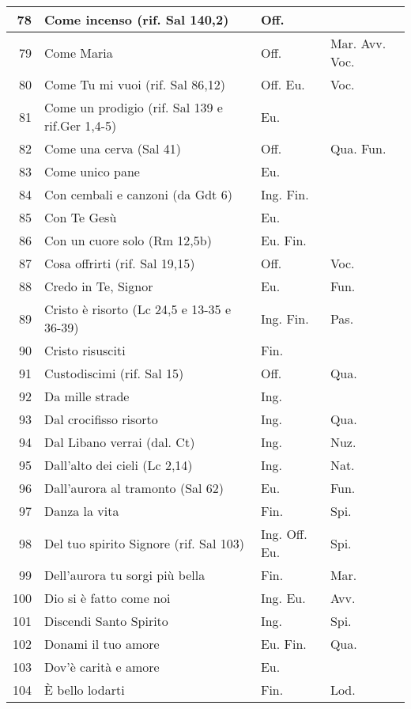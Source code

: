 {\begin{center}
\begin{longtable}{ | r | m{4.7cm} | m{1.8cm} | m{2cm}  |}
    78 & Come incenso (rif. Sal 140,2) & Off. & \\ \hline
    79 & Come Maria & Off. & Mar. Avv. Voc.\\ \hline
    80 & Come Tu mi vuoi (rif. Sal 86,12) & Off. Eu. & Voc.\\ \hline
    81 & Come un prodigio (rif. Sal 139 e rif.Ger 1,4-5) & Eu. & \\ \hline
    82 & Come una cerva (Sal 41) & Off. & Qua. Fun.\\ \hline
    83 & Come unico pane & Eu. & \\ \hline
    84 & Con cembali e canzoni (da Gdt 6) & Ing. Fin. & \\ \hline
    85 & Con Te Gesù & Eu. & \\ \hline
    86 & Con un cuore solo (Rm 12,5b) & Eu. Fin. & \\ \hline
    87 & Cosa offrirti (rif. Sal 19,15) & Off. & Voc.\\ \hline
    88 & Credo in Te, Signor & Eu. & Fun.\\ \hline
    89 & Cristo è risorto (Lc 24,5 e 13-35 e 36-39) & Ing. Fin. & Pas.\\ \hline
    90 & Cristo risusciti & Fin. & \\ \hline
    91 & Custodiscimi (rif. Sal 15) & Off. & Qua.\\ \hline
    92 & Da mille strade & Ing. & \\ \hline
    93 & Dal crocifisso risorto & Ing. & Qua.\\ \hline
    94 & Dal Libano verrai (dal. Ct) & Ing. & Nuz.\\ \hline
    95 & Dall'alto dei cieli (Lc 2,14) & Ing. & Nat.\\ \hline
    96 & Dall'aurora al tramonto (Sal 62) & Eu. & Fun.\\ \hline
    97 & Danza la vita & Fin. & Spi.\\ \hline
    98 & Del tuo spirito Signore (rif. Sal 103) & Ing. Off. Eu. & Spi.\\ \hline
    99 & Dell'aurora tu sorgi più bella & Fin. & Mar.\\ \hline
    100 & Dio si è fatto come noi & Ing. Eu. & Avv.\\ \hline
    101 & Discendi Santo Spirito & Ing. & Spi.\\ \hline
    102 & Donami il tuo amore & Eu. Fin. & Qua. \\ \hline
    103 & Dov'è carità e amore & Eu. & \\ \hline
    104 & È bello lodarti & Fin. & Lod.\\ \hline

\end{longtable}
\end{center}}
